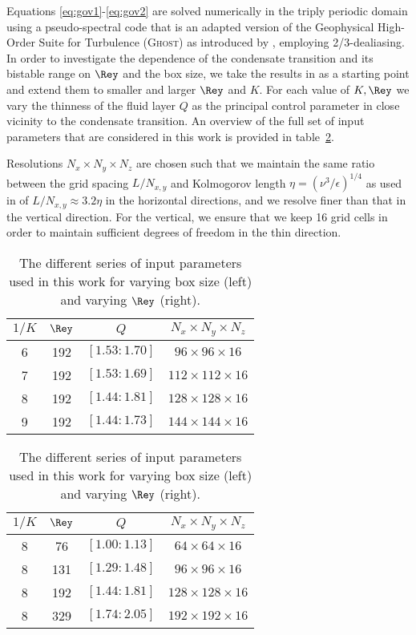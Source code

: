 \documentclass[]{jfm}
\begin{document}
Equations \eqref{eq:gov1}-\eqref{eq:gov2} are solved numerically in the triply periodic domain using a pseudo-spectral code that is an adapted version of the Geophysical High-Order Suite for Turbulence (\textsc{Ghost}) as introduced by \citet{Mininni2011}, employing 2/3-dealiasing. In order to investigate the dependence of the condensate transition and its bistable range on $\Rey$ and the box size, we take the results in \citet{VanKan2019a} as a starting point and extend them to smaller and larger $\Rey$ and $K$. For each value of $K,\Rey$ we vary the thinness of the fluid layer $Q$ as the principal control parameter in close vicinity to the condensate transition. An overview of the full set of input parameters that are considered in this work is provided in table~\ref{tab:input}.

Resolutions $N_x\times N_y\times N_z$ are chosen such that we maintain the same ratio between the grid spacing $L/N_{x,y}$ and Kolmogorov length $\eta=(\nu^3/\epsilon)^{1/4}$ as used in \citet{VanKan2019a} of $L/N_{x,y}\approx3.2\eta$ in the horizontal directions, and we resolve finer than that in the vertical direction. For the vertical, we ensure that we keep 16 grid cells in order to maintain sufficient degrees of freedom in the thin direction.

\begin{table}
    \renewcommand\arraystretch{1.1}
    \centering
    \caption{The different series of input parameters used in this work for varying box size (left) and varying $\Rey$ (right).}\label{tab:input}
    \begin{tabular}{cccc}
        \toprule
        $1/K$&$\Rey$&$Q$&$N_x\times N_y\times N_z$\\
        \midrule
        6&192&$[1.53:1.70]$&$96\times96\times16$\\
        7&192&$[1.53:1.69]$&$112\times112\times16$\\
        8&192&$[1.44:1.81]$&$128\times128\times16$\\
        9&192&$[1.44:1.73]$&$144\times144\times16$\\
        \bottomrule
    \end{tabular}
    \qquad
    \begin{tabular}{cccc}
        \toprule
        $1/K$&$\Rey$&$Q$&$N_x\times N_y\times N_z$\\
        \midrule
        8&76&$[1.00:1.13]$&$64\times64\times16$\\
        8&131&$[1.29:1.48]$&$96\times96\times16$\\
        8&192&$[1.44:1.81]$&$128\times128\times16$\\
        8&329&$[1.74:2.05]$&$192\times192\times16$\\
        \bottomrule
    \end{tabular}
\end{table}
\end{document}

